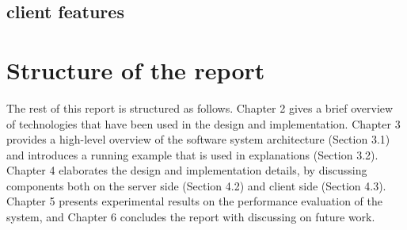 \subsection{client features}


\section{Structure of the report}
The rest of this report is structured as follows. Chapter 2 gives a brief overview of technologies that have been used in the design and implementation. Chapter 3 provides a high-level overview of the software system architecture (Section 3.1) and introduces a running example that is used in explanations (Section 3.2). Chapter 4 elaborates the design and implementation details, by discussing components both on the server side (Section 4.2) and client side (Section 4.3). Chapter 5 presents experimental results on the performance evaluation of the system, and Chapter 6 concludes the report with discussing on future work.



